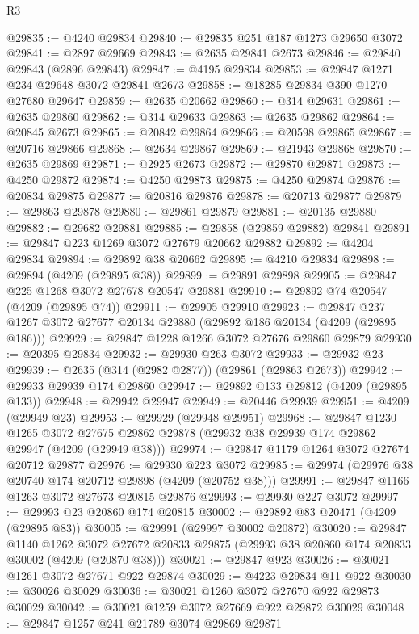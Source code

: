 \begin{lexlean}{R3}
\begin{coremodule}
@29835 := @4240 @29834
@29840 := @29835 @251 @187 @1273 @29650 @3072
@29841 := @2897 @29669
@29843 := @2635 @29841 @2673
@29846 := @29840 @29843 (@2896 @29843)
@29847 := @4195 @29834
@29853 := @29847 @1271 @234 @29648 @3072 @29841 @2673
@29858 := @18285 @29834 @390 @1270 @27680 @29647
@29859 := @2635 @20662
@29860 := @314 @29631
@29861 := @2635 @29860
@29862 := @314 @29633
@29863 := @2635 @29862
@29864 := @20845 @2673
@29865 := @20842 @29864
@29866 := @20598 @29865
@29867 := @20716 @29866
@29868 := @2634 @29867
@29869 := @21943 @29868
@29870 := @2635 @29869
@29871 := @2925 @2673
@29872 := @29870 @29871
@29873 := @4250 @29872
@29874 := @4250 @29873
@29875 := @4250 @29874
@29876 := @20834 @29875
@29877 := @20816 @29876
@29878 := @20713 @29877
@29879 := @29863 @29878
@29880 := @29861 @29879
@29881 := @20135 @29880
@29882 := @29682 @29881
@29885 := @29858 (@29859 @29882) @29841
@29891 := @29847 @223 @1269 @3072 @27679 @20662 @29882
@29892 := @4204 @29834
@29894 := @29892 @38 @20662
@29895 := @4210 @29834
@29898 := @29894 (@4209 (@29895 @38))
@29899 := @29891 @29898
@29905 := @29847 @225 @1268 @3072 @27678 @20547 @29881
@29910 := @29892 @74 @20547 (@4209 (@29895 @74))
@29911 := @29905 @29910
@29923 := @29847 @237 @1267 @3072 @27677 @20134 @29880 (@29892 @186 @20134 (@4209 (@29895 @186)))
@29929 := @29847 @1228 @1266 @3072 @27676 @29860 @29879
@29930 := @20395 @29834
@29932 := @29930 @263 @3072
@29933 := @29932 @23
@29939 := @2635 (@314 (@2982 @2877)) (@29861 (@29863 @2673))
@29942 := @29933 @29939 @174 @29860
@29947 := @29892 @133 @29812 (@4209 (@29895 @133))
@29948 := @29942 @29947
@29949 := @20446 @29939
@29951 := @4209 (@29949 @23)
@29953 := @29929 (@29948 @29951)
@29968 := @29847
    @1230
    @1265
    @3072
    @27675
    @29862
    @29878
    (@29932 @38 @29939 @174 @29862 @29947 (@4209 (@29949 @38)))
@29974 := @29847 @1179 @1264 @3072 @27674 @20712 @29877
@29976 := @29930 @223 @3072
@29985 := @29974 (@29976 @38 @20740 @174 @20712 @29898 (@4209 (@20752 @38)))
@29991 := @29847 @1166 @1263 @3072 @27673 @20815 @29876
@29993 := @29930 @227 @3072
@29997 := @29993 @23 @20860 @174 @20815
@30002 := @29892 @83 @20471 (@4209 (@29895 @83))
@30005 := @29991 (@29997 @30002 @20872)
@30020 := @29847
    @1140
    @1262
    @3072
    @27672
    @20833
    @29875
    (@29993 @38 @20860 @174 @20833 @30002 (@4209 (@20870 @38)))
@30021 := @29847 @923
@30026 := @30021 @1261 @3072 @27671 @922 @29874
@30029 := @4223 @29834 @11 @922
@30030 := @30026 @30029
@30036 := @30021 @1260 @3072 @27670 @922 @29873 @30029
@30042 := @30021 @1259 @3072 @27669 @922 @29872 @30029
@30048 := @29847 @1257 @241 @21789 @3074 @29869 @29871

\end{coremodule}
\end{lexlean}
